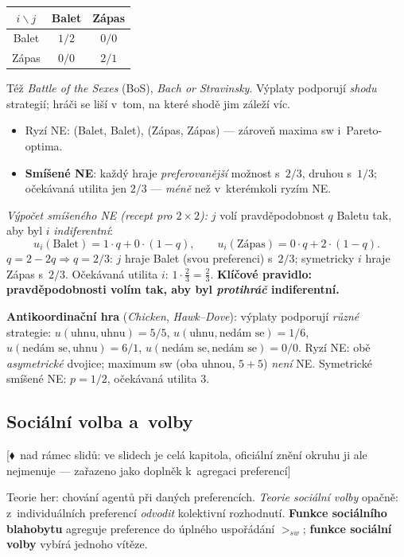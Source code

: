 \documentclass[11pt,a4paper]{article}
\theoremstyle{definition}
\newcommand{\mimoq}[1]{\textcolor{markcol}{\textsf{\footnotesize[$\blacklozenge$~nad rámec slidů: #1]}}}
\begin{document}
\begin{defbox}
\begin{center}
\begin{tabular}{c|cc}
$i \backslash j$ & Balet & Zápas \\
\hline
Balet & $1/2$ & $0/0$ \\
Zápas & $0/0$ & $2/1$ \\
\end{tabular}
\end{center}
Též \emph{Battle of the Sexes} (BoS), \emph{Bach or Stravinsky}. Výplaty podporují \emph{shodu}
strategií; hráči se liší v~tom, na které shodě jim záleží víc.
\begin{itemize}
\item Ryzí NE: (Balet, Balet), (Zápas, Zápas) --- zároveň maxima sw i~Pareto-optima.
\item \textbf{Smíšené NE}: každý hraje \emph{preferovanější} možnost s~$2/3$, druhou s~$1/3$;
  očekávaná utilita jen $2/3$ --- \emph{méně} než v~kterémkoli ryzím NE.
\end{itemize}
\emph{Výpočet smíšeného NE (recept pro $2\times2$):} $j$ volí pravděpodobnost $q$ Baletu tak, aby
byl $i$ \emph{indiferentní}:
\[
u_i(\text{Balet}) = 1\cdot q + 0\cdot(1-q), \qquad u_i(\text{Zápas}) = 0\cdot q + 2\cdot(1-q).
\]
$q = 2 - 2q \Rightarrow q = 2/3$: $j$ hraje Balet (svou preferenci) s~$2/3$; symetricky $i$ hraje
Zápas s~$2/3$. Očekávaná utilita $i$: $1 \cdot \frac{2}{3} = \frac{2}{3}$.
\textbf{Klíčové pravidlo: pravděpodobnosti volím tak, aby byl \emph{protihráč} indiferentní.}
\end{defbox}

\noindent\textbf{Antikoordinační hra} (\emph{Chicken}, \emph{Hawk--Dove}): výplaty podporují
\emph{různé} strategie:
$u(\text{uhnu},\text{uhnu}) = 5/5$, $u(\text{uhnu},\text{nedám se}) = 1/6$,
$u(\text{nedám se},\text{uhnu}) = 6/1$, $u(\text{nedám se},\text{nedám se}) = 0/0$.
Ryzí NE: obě \emph{asymetrické} dvojice; maximum sw (oba uhnou, $5+5$) \emph{není} NE.
Symetrické smíšené NE: $p = 1/2$, očekávaná utilita $3$.

\subsection{Sociální volba a~volby}
\label{ssec:volby}

\noindent\mimoq{ve slidech je celá kapitola, oficiální znění okruhu ji ale nejmenuje ---
zařazeno jako doplněk k~agregaci preferencí}

Teorie her: chování agentů při daných preferencích. \emph{Teorie sociální volby} opačně:
z~individuálních preferencí \emph{odvodit} kolektivní rozhodnutí. \textbf{Funkce sociálního
blahobytu} agreguje preference do úplného uspořádání $>_{sw}$; \textbf{funkce sociální volby}
vybírá jednoho vítěze.
\end{document}
